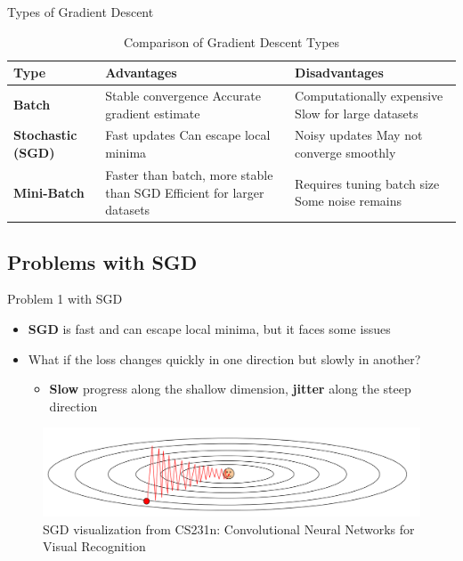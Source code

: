 \documentclass[serif, aspectratio=169]{beamer}
\begin{document}
\begin{frame}{Types of Gradient Descent}
\begin{table}[h!]
\centering
\begin{tabularx}{\textwidth}{@{} lX X @{}}
\toprule
\textbf{Type} & \textbf{Advantages} & \textbf{Disadvantages} \\ 
\midrule
\textbf{Batch}   & 
Stable convergence \newline 
Accurate gradient estimate  & 
Computationally expensive \newline 
Slow for large datasets \\ 
\midrule
\textbf{Stochastic (SGD)}   & 
Fast updates \newline 
Can escape local minima & 
Noisy updates \newline 
May not converge smoothly \\ 
\midrule
\textbf{Mini-Batch}   & 
Faster than batch, more stable than SGD \newline 
Efficient for larger datasets & 
Requires tuning batch size \newline 
Some noise remains \\ 
\bottomrule
\end{tabularx}
\caption{\footnotesize Comparison of Gradient Descent Types}
\end{table}
\end{frame}

\subsection{Problems with SGD}
\begin{frame}{Problem 1 with SGD}
    \begin{itemize}
        \item \textbf{SGD} is fast and can escape local minima, but it faces some issues
        \item What if the loss changes quickly in one direction but slowly in another?
        \begin{itemize}
            \item \textbf{Slow} progress along the shallow dimension, \textbf{jitter} along the steep direction
        \end{itemize}
    \end{itemize}
    \hfill
    \hfill
    \begin{center}
        \begin{figure}
            \includegraphics[width=1\linewidth]{pic/sgd_stanford.png}
            \caption{\footnotesize SGD visualization from CS231n: Convolutional Neural Networks for Visual Recognition}
        \end{figure}
    \end{center}
\end{frame}
\end{document}
